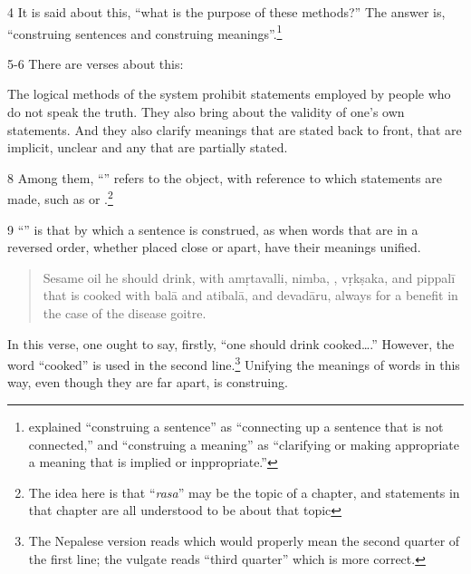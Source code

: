 \begin{translation}
\item [4] It is said about this, “what is the purpose of these methods?”
The answer is, “construing sentences and construing
meanings”.\footnote{ explained “construing a
    sentence” as “connecting up a sentence that is not connected,” and
    “construing a meaning” as “clarifying  or making appropriate a meaning
    that is implied or inppropriate.”}

\item [5-6] There are  verses about this:
  
\begin{sloka}
The logical methods of the system prohibit
statements employed by people who do not speak the truth.
They also bring about the validity of one’s own
statements.  And they also clarify meanings that are stated back to
front, that are implicit, unclear and any that are partially stated.
\end{sloka}

\item [8] Among them, “” refers to the object, with 
reference to which statements are made, such as  or 
.\footnote{The idea here is that “\emph{rasa}” may be the 
topic of a chapter, and statements in that chapter are all understood to be about 
that topic}

\item [9] “” is that by which a sentence
is construed, as when words that are in a reversed order, whether placed close
or apart, have their meanings unified.
\begin{quote}
    Sesame oil he should drink, with 
\gls{amṛtavalli}, 
\gls{nimba},
,
\gls{vṛkṣaka}, and
\gls{pippalī}
\\[2ex]
that is cooked with 
\gls{balā} and \gls{atibalā}, %
and
\gls{devadāru},
always for a benefit in the case of the disease goitre.
\end{quote}
In this verse, one ought to say, firstly, “one should drink
cooked\ldots.” However, the word “cooked” is used in the second
line.\footnote{The Nepalese version reads  which would
    properly mean the second quarter of the first line; the vulgate reads
    “third quarter” which is more correct.} Unifying the meanings of words in
    this way, even though they are far apart, is construing. 
 


\end{translation}

